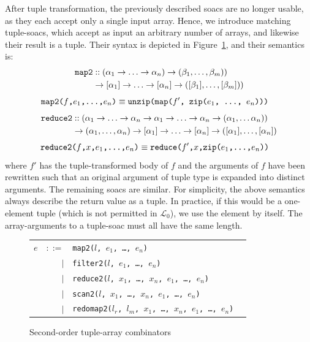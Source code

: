 \documentclass{sigplanconf}  %
\newcommand{\LO}{$\mathcal{L}_0$}
\begin{document}
After tuple transformation, the previously described {\sc soac}s are
no longer usable, as they each accept only a single input array.
Hence, we introduce matching tuple-{\sc soac}s, which accept as input
an arbitrary number of arrays, and likewise their result is
a tuple.
Their syntax is depicted in Figure~\ref{fig:tuple-soacs}, 
and their semantics is: %
\begin{align*}
  \text{\tt map2} &:: (\alpha_{1}\rightarrow\ldots\rightarrow\alpha_{n})\rightarrow(\beta_{1},\ldots,\beta_{m}))\\
&\rightarrow[\alpha_{1}]\rightarrow\ldots\rightarrow[\alpha_{n}]\rightarrow([\beta_{1}],\ldots,[\beta_{m}]))
\end{align*}
\begin{align*}
  \text{\tt map2($f$,$e_{1}$,\ldots,$e_{n}$)} & \equiv \text{\tt unzip(map($f'$, zip($e_{1}$, \ldots, $e_{n}$)))}
\end{align*}
\begin{align*}
  \text{\tt reduce2} &::(\alpha_{1}\rightarrow\ldots\rightarrow\alpha_{n}\rightarrow\alpha_{1}\rightarrow\ldots\rightarrow\alpha_{n}\rightarrow(\alpha_{1},\ldots\alpha_{n}))\\
& \rightarrow(\alpha_{1},\ldots,\alpha_{n})\rightarrow[\alpha_{1}]\rightarrow\ldots\rightarrow[\alpha_{n}]\rightarrow([\alpha_{1}],\ldots,[\alpha_{n}])
\end{align*}
\begin{align*}
  \text{\tt reduce2($f$,$x$,$e_{1}$,\ldots,$e_{n}$)} &\equiv \text{\tt reduce($f'$,$x$,zip($e_{1}$,\ldots,$e_{n}$))}
\end{align*}
\noindent where $f'$ has the tuple-transformed body of $f$ and the arguments
of $f$ have been rewritten such that an original argument of tuple type is
expanded into distinct arguments.
The remaining {\sc soac}s are similar.    For simplicity, the
above semantics always describe the return value as a tuple.  In
practice, if this would be a one-element tuple (which is not permitted
in \LO), we use the element by itself.  The array-arguments to a
tuple-{\sc soac} must all have the same length.

\begin{figure}[bt]
\begin{tabular}{lrll}
$e$ & $::=$ & {\tt map2($l$, $e_{1}$, \ldots, $e_{n}$)} \\
    & $|$ & {\tt filter2($l$, $e_{1}$, \ldots, $e_{n}$)} \\
    & $|$ & {\tt reduce2($l$, $x_{1}$, \ldots, $x_{n}$, $e_{1}$, \ldots, $e_{n}$)} \\
    & $|$ & {\tt scan2($l$, $x_{1}$, \ldots, $x_{n}$, $e_{1}$, \ldots, $e_{n}$)} \\
    & $|$ & {\tt redomap2($l_{r}$, $l_{m}$, $x_{1}$, \ldots, $x_{n}$, $e_{1}$, \ldots, $e_{n}$)} \\
\end{tabular}
\caption{Second-order tuple-array combinators}
\label{fig:tuple-soacs}
\end{figure}
\end{document}
